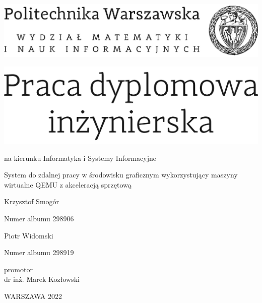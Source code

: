 \documentclass[12pt,twoside,a4paper]{article}
\newcommand{\discipline}{Informatyka i Systemy Informacyjne}
\renewcommand{\title}{System do zdalnej pracy w środowisku graficznym wykorzystujący maszyny wirtualne QEMU z akceleracją sprzętową}
\newcommand{\supervisor}{dr inż. Marek Kozłowski}
\renewcommand{\year}{2022}
\newcommand{\authori}{Krzysztof Smogór}
\newcommand{\albumi}{298906}
\newcommand{\authorii}{Piotr Widomski}
\newcommand{\albumii}{298919}
\begin{document}
\pagestyle{empty}

\begin{center}

\includegraphics[scale=1.]{img/politechnika}
\vspace{40pt}

\includegraphics[scale=1.]{img/praca_inz}  %

{ \arial na kierunku \discipline

\vspace{30pt}
{\arial \large \title}

\vspace{40pt}

{\arial \huge \authori }

\vspace{5pt}

Numer albumu \albumi

\vspace {20pt}
{\arial \huge \authorii}

\vspace{5pt}

Numer albumu \albumii

\vspace{40pt}

promotor \\
{\arial \supervisor}

\vspace{15pt}


 \vfill
WARSZAWA \year \\
}
\end{center}


%
%
\end{document}
